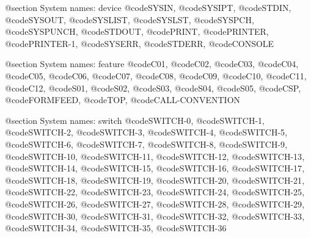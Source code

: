 @section System names: device
@code{SYSIN}, @code{SYSIPT}, @code{STDIN}, @code{SYSOUT}, @code{SYSLIST}, @code{SYSLST}, @code{SYSPCH}, @code{SYSPUNCH}, @code{STDOUT}, @code{PRINT}, @code{PRINTER}, @code{PRINTER-1}, @code{SYSERR}, @code{STDERR}, @code{CONSOLE}

@section System names: feature
@code{C01}, @code{C02}, @code{C03}, @code{C04}, @code{C05}, @code{C06}, @code{C07}, @code{C08}, @code{C09}, @code{C10}, @code{C11}, @code{C12}, @code{S01}, @code{S02}, @code{S03}, @code{S04}, @code{S05}, @code{CSP}, @code{FORMFEED}, @code{TOP}, @code{CALL-CONVENTION}

@section System names: switch
@code{SWITCH-0}, @code{SWITCH-1}, @code{SWITCH-2}, @code{SWITCH-3}, @code{SWITCH-4}, @code{SWITCH-5}, @code{SWITCH-6}, @code{SWITCH-7}, @code{SWITCH-8}, @code{SWITCH-9}, @code{SWITCH-10}, @code{SWITCH-11}, @code{SWITCH-12}, @code{SWITCH-13}, @code{SWITCH-14}, @code{SWITCH-15}, @code{SWITCH-16}, @code{SWITCH-17}, @code{SWITCH-18}, @code{SWITCH-19}, @code{SWITCH-20}, @code{SWITCH-21}, @code{SWITCH-22}, @code{SWITCH-23}, @code{SWITCH-24}, @code{SWITCH-25}, @code{SWITCH-26}, @code{SWITCH-27}, @code{SWITCH-28}, @code{SWITCH-29}, @code{SWITCH-30}, @code{SWITCH-31}, @code{SWITCH-32}, @code{SWITCH-33}, @code{SWITCH-34}, @code{SWITCH-35}, @code{SWITCH-36}

